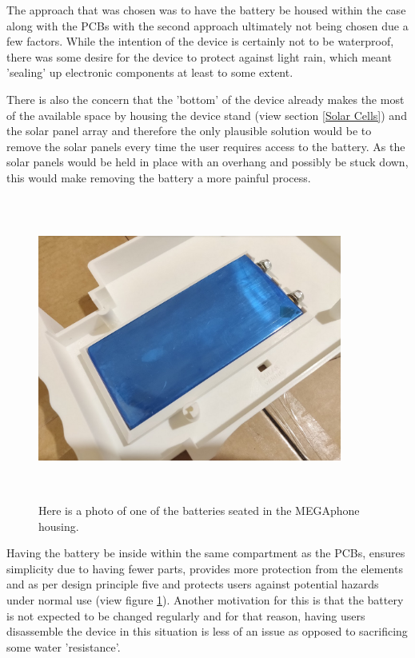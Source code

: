 The approach that was chosen was to have the battery be housed within the case along with the PCBs with the second approach ultimately not being chosen due a few factors.
While the intention of the device is certainly not to be waterproof, there was some desire for the device to protect against light rain, which meant 'sealing' up electronic components at least to some extent.

There is also the concern that the 'bottom' of the device already makes the most of the available space by housing the device stand (view section \ref{Solar Cells}) and the solar panel array and therefore the only plausible solution would be to remove the solar panels every time the user requires access to the battery.
As the solar panels would be held in place with an overhang and possibly be stuck down, this would make removing the battery a more painful process.

\begin{figure} [h]
    \centering
    \includegraphics[width=10cm,height=10cm,keepaspectratio]{Figures/battery_housing.png}
    \caption{Here is a photo of one of the batteries seated in the MEGAphone housing.}
    \label{fig:Battery}
\end{figure}

Having the battery be inside within the same compartment as the PCBs, ensures simplicity due to having fewer parts, provides more protection from the elements and as per design principle five and protects users against potential hazards under normal use (view figure \ref{fig:Battery}).
Another motivation for this is that the battery is not expected to be changed regularly and for that reason, having users disassemble the device in this situation is less of an issue as opposed to sacrificing some water 'resistance'.

